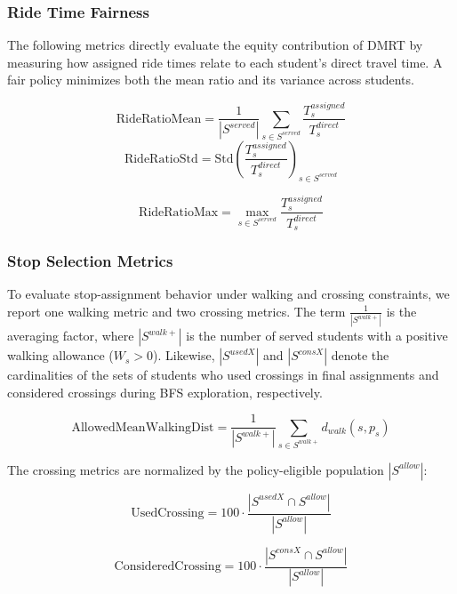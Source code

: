\documentclass[journal]{IEEEtran}
\begin{document}
\subsubsection{Ride Time Fairness}

The following metrics directly evaluate the equity contribution 
of DMRT by measuring how assigned ride times relate to each 
student's direct travel time. A fair policy minimizes both the 
mean ratio and its variance across students.

\begin{equation}
\text{RideRatioMean} = \frac{1}{|S^{served}|} 
\sum_{s \in S^{served}} \frac{T_s^{assigned}}{T_s^{direct}}
\end{equation}
\begin{equation}
\text{RideRatioStd} = \mathrm{Std}
\!\left(\frac{T_s^{assigned}}{T_s^{direct}}
\right)_{\!s \in S^{served}}
\end{equation}

\begin{equation}
\text{RideRatioMax} = \max_{s \in S^{served}} 
\frac{T_s^{assigned}}{T_s^{direct}}
\end{equation}

\subsubsection{Stop Selection Metrics}

To evaluate stop-assignment behavior under walking and crossing
constraints, we report one walking metric and two crossing metrics.
The term $\frac{1}{|S^{walk+}|}$ is the averaging factor, where
$|S^{walk+}|$ is the number of served students with a positive
walking allowance ($W_s>0$). Likewise, $|S^{usedX}|$ and
$|S^{consX}|$ denote the cardinalities of the sets of students who
used crossings in final assignments and considered crossings during
BFS exploration, respectively.

\begin{equation}
\text{AllowedMeanWalkingDist} =
\frac{1}{|S^{walk+}|}
\sum_{s\in S^{walk+}} d_{walk}(s,p_s)
\end{equation}

The crossing metrics are normalized by the policy-eligible population
$|S^{allow}|$:

\begin{equation}
\text{UsedCrossing} = 100 \cdot 
\frac{|S^{usedX} \cap S^{allow}|}{|S^{allow}|}
\end{equation}

\begin{equation}
\text{ConsideredCrossing} = 100 \cdot 
\frac{|S^{consX} \cap S^{allow}|}{|S^{allow}|}
\end{equation}
\end{document}
